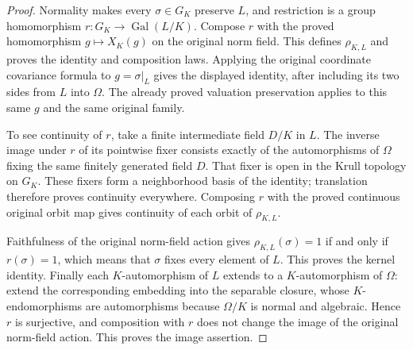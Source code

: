 \begin{proof}
Normality makes every $\sigma\in G_K$ preserve $L$, and restriction is
a group homomorphism $r:G_K\longrightarrow\operatorname{Gal}(L/K)$.
Compose $r$ with the proved homomorphism $g\mapsto X_K(g)$ on the
original norm field. This defines $\rho_{K,L}$ and proves the identity
and composition laws. Applying the original coordinate covariance
formula to $g=\sigma|_L$ gives the displayed identity, after including
its two sides from $L$ into $\Omega$. The already proved valuation
preservation applies to this same $g$ and the same original family.

To see continuity of $r$, take a finite intermediate field $D/K$ in
$L$. The inverse image under $r$ of its pointwise fixer consists exactly
of the automorphisms of $\Omega$ fixing the same finitely generated
field $D$. That fixer is open in the Krull topology on $G_K$.
These fixers form a neighborhood basis of the identity; translation
therefore proves continuity everywhere. Composing $r$ with the proved
continuous original orbit map gives continuity of each orbit of
$\rho_{K,L}$.

Faithfulness of the original norm-field action gives
$\rho_{K,L}(\sigma)=1$ if and only if $r(\sigma)=1$, which means
that $\sigma$ fixes every element of $L$. This proves the kernel
identity. Finally each $K$-automorphism of $L$ extends to a
$K$-automorphism of $\Omega$: extend the corresponding embedding
into the separable closure, whose $K$-endomorphisms are automorphisms
because $\Omega/K$ is normal and algebraic. Hence $r$ is surjective,
and composition with $r$ does not change the image of the original
norm-field action. This proves the image assertion.
\end{proof}

